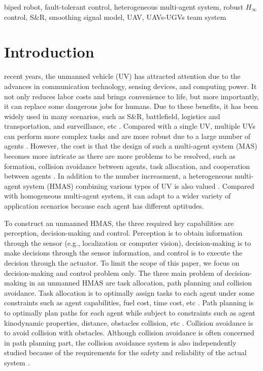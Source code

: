 \documentclass{ieeeaccess}
\begin{document}
\begin{keywords}
biped robot, fault-tolerant control, heterogeneous multi-agent system, robust $H_\infty$ control, S\&R, smoothing signal model, UAV, UAVs-UGVs team system
\end{keywords}

\titlepgskip=-15pt

\maketitle

\section{Introduction}
 recent years, the unmanned vehicle (UV) has attracted attention due to the advances in communication technology, sensing devices, and computing power. It not only reduces labor costs and brings convenience to life, but more importantly, it can replace some dangerous jobs for humans. Due to these benefits, it has been widely used in many scenarios, such as S\&R, battlefield, logistics and transportation, and surveillance, etc \cite{9700861}. Compared with a single UV, multiple UVs can perform more complex tasks and are more robust due to a large number of agents \cite{8352646}. However, the cost is that the design of such a multi-agent system (MAS) becomes more intricate as there are more problems to be resolved, such as formation, collision avoidance between agents, task allocation, and cooperation between agents \cite{chen2019control}. In addition to the number increasment, a heterogeneous multi-agent system (HMAS) combining various types of UV is also valued \cite{9371292}. Compared with homogeneous multi-agent system, it can adapt to a wider variety of application scenarios because each agent has different aptitudes.

To construct an unmanned HMAS, the three required key capabilities are perception, decision-making and control. Perception is to obtain information through the sensor (e.g., localization or computer vision), decision-making is to make decisions through the sensor information, and control is to execute the decision through the actuator. To limit the scope of this paper, we focus on decision-making and control problem only. The three main problem of decision-making in an unmanned HMAS are task allocation, path planning and collision avoidance. Task allocation is to optimally assign tasks to each agent under some constraints such as agent capabilities, fuel cost, time cost, etc \cite{9476736}. Path planning is to optimally plan paths for each agent while subject to constraints such as agent kinodynamic properties, distance, obstacles collision, etc \cite{zhang2018path}. Collision avoidance is to avoid collision with obstacles. Although collision avoidance is often concerned in path planning part, the collision avoidance system is also independently studied because of the requirements for the safety and reliability of the actual system \cite{9108245}.
\end{document}
